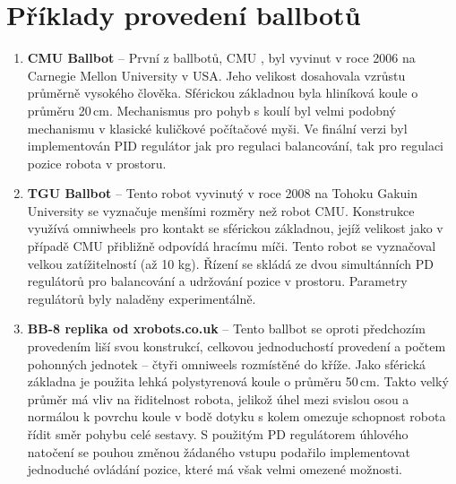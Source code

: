 \newpage

\section{Příklady provedení ballbotů}
\label{priklady}

\begin{enumerate}

\item \textbf{CMU Ballbot} -- První z ballbotů, CMU \cite{cmu}, byl vyvinut v roce 2006 na Carnegie Mellon University v USA. Jeho velikost dosahovala vzrůstu průměrně vysokého člověka. Sférickou základnou byla hliníková koule o průměru 20\,cm. Mechanismus pro pohyb s koulí byl velmi podobný mechanismu v klasické kuličkové počítačové myši. Ve finální verzi byl implementován PID regulátor jak pro regulaci balancování, tak pro regulaci pozice robota v prostoru.

\item \textbf{TGU Ballbot} -- Tento robot vyvinutý v roce 2008 na Tohoku Gakuin University \cite{tgu} se vyznačuje menšími rozměry než robot CMU. Konstrukce využívá omniwheels pro kontakt se sférickou základnou, jejíž velikost jako v případě CMU přibližně odpovídá hracímu míči. Tento robot se vyznačoval velkou zatížitelností (až 10 kg). Řízení se skládá ze dvou simultánních PD regulátorů pro balancování a udržování pozice v prostoru. Parametry regulátorů byly naladěny experimentálně.

\item \textbf{BB-8 replika od xrobots.co.uk} -- Tento ballbot \cite{bb8} se oproti předchozím provedením liší svou konstrukcí, celkovou jednoduchostí provedení a počtem pohonných jednotek -- čtyři omniweels rozmístěné do kříže. Jako sférická základna je použita lehká polystyrenová koule o průměru 50\,cm. Takto velký průměr má vliv na řiditelnost robota, jelikož úhel mezi svislou osou a normálou k povrchu koule v bodě dotyku s kolem omezuje schopnost robota řídit směr pohybu celé sestavy. S použitým PD regulátorem úhlového natočení se pouhou změnou žádaného vstupu podařilo implementovat jednoduché ovládání pozice, které má však velmi omezené možnosti.


\end{enumerate}
